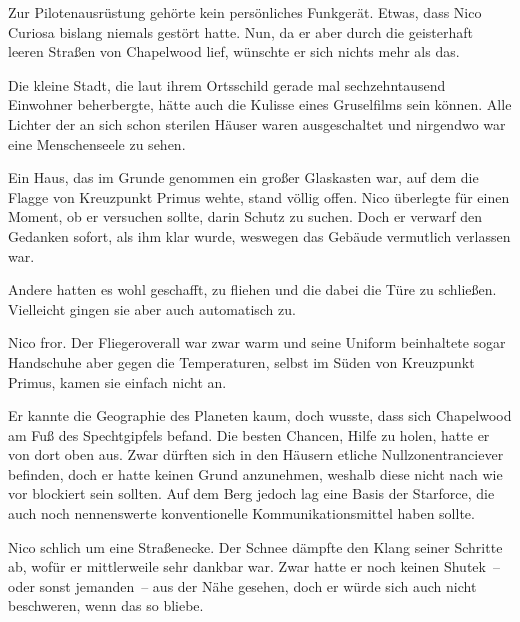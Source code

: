 Zur Pilotenausrüstung gehörte kein persönliches Funkgerät. Etwas, dass Nico Curiosa bislang niemals gestört hatte. Nun, da er aber durch die geisterhaft leeren Straßen von Chapelwood lief, wünschte er sich nichts mehr als das.

\par

Die kleine Stadt, die laut ihrem Ortsschild gerade mal sechzehntausend Einwohner beherbergte, hätte auch die Kulisse eines Gruselfilms sein können. Alle Lichter der an sich schon sterilen Häuser waren ausgeschaltet und nirgendwo war eine Menschenseele zu sehen.

\par

Ein Haus, das im Grunde genommen ein großer Glaskasten war, auf dem die Flagge von Kreuzpunkt Primus wehte, stand völlig offen. Nico überlegte für einen Moment, ob er versuchen sollte, darin Schutz zu suchen. Doch er verwarf den Gedanken sofort, als ihm klar wurde, weswegen das Gebäude vermutlich verlassen war.

\par

Andere hatten es wohl geschafft, zu fliehen und die dabei die Türe zu schließen. Vielleicht gingen sie aber auch automatisch zu.

\par

Nico fror. Der Fliegeroverall war zwar warm und seine Uniform beinhaltete sogar Handschuhe aber gegen die Temperaturen, selbst im Süden von Kreuzpunkt Primus, kamen sie einfach nicht an.

\par

Er kannte die Geographie des Planeten kaum, doch wusste, dass sich Chapelwood am Fuß des Spechtgipfels befand. Die besten Chancen, Hilfe zu holen, hatte er von dort oben aus. Zwar dürften sich in den Häusern etliche Nullzonentranciever befinden, doch er hatte keinen Grund anzunehmen, weshalb diese nicht nach wie vor blockiert sein sollten. Auf dem Berg jedoch lag eine Basis der Starforce, die auch noch nennenswerte konventionelle Kommunikationsmittel haben sollte.

\par

Nico schlich um eine Straßenecke. Der Schnee dämpfte den Klang seiner Schritte ab, wofür er mittlerweile sehr dankbar war. Zwar hatte er noch keinen Shutek~-- oder sonst jemanden~-- aus der Nähe gesehen, doch er würde sich auch nicht beschweren, wenn das so bliebe.

